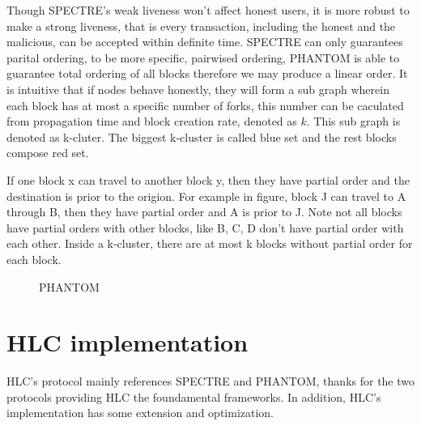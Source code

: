 \documentclass[a4paper,11pt]{article}
\begin{document}
Though SPECTRE's weak liveness won't affect honest users, it is more robust to make a strong liveness, that is every transaction, including the honest and the malicious, can be accepted within definite time. SPECTRE can only guarantees parital ordering, to be more specific, pairwised ordering, PHANTOM is able to guarantee total ordering of all blocks therefore we may produce a linear order. It is intuitive that if nodes behave honestly, they will form a sub graph wherein each block has at most a specific number of forks, this number can be caculated from propagation time and block creation rate, denoted as $k$. This sub graph is denoted as k-cluter. The biggest k-cluster is called blue set and the rest blocks compose red set.

If one block x can travel to another block y, then they have partial order and the destination is prior to the origion. For example in figure, block J can travel to A through B, then they have partial order and A is prior to J. Note not all blocks have partial orders with other blocks, like B, C, D don't have partial order with each other. Inside a k-cluster, there are at most k blocks without partial order for each block.

\begin{figure}[h]
	\centerline{%
	}
\caption{PHANTOM}
\end{figure}

\section{HLC implementation}
HLC's protocol mainly references SPECTRE and PHANTOM, thanks for the two protocols providing HLC the foundamental frameworks. In addition, HLC's implementation has some extension and optimization.
\end{document}
